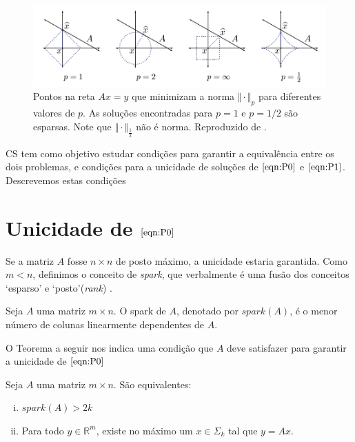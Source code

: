 \begin{figure}
\centering
\includegraphics[scale=.6]{imagens/normas.png}
\caption{Pontos na reta $Ax = y$ que minimizam a norma $\Vert \cdot \Vert_p$ para diferentes valores de $p$. As soluções encontradas para $p = 1$ e $p = 1/2$ são esparsas. Note que $\Vert \cdot \Vert_{\frac{1}{2}}$ não é norma. Reproduzido de \cite{ddek}.}
\label{fig:normas}
\end{figure}

CS tem como objetivo estudar condições para garantir a equivalência entre os dois problemas, e condições para a unicidade de soluções de $\eqref{eqn:P0}$ e $\eqref{eqn:P1}$. Descrevemos estas condições  

\section{Unicidade de $\eqref{eqn:P0}$}
Se a matriz $A$ fosse $n \times n$ de posto máximo, a unicidade estaria garantida. Como $m < n$, definimos o conceito de \textit{spark}, que verbalmente é uma fusão dos conceitos `esparso' e `posto'(\textit{rank}) \cite{kutyniok}.

\begin{definicao}
Seja $A$ uma matriz $m \times n$. O spark de $A$, denotado por $\textit{spark}(A)$, é o menor número de colunas linearmente dependentes de $A$.
\end{definicao}

O Teorema a seguir nos indica uma condição que $A$ deve satisfazer para garantir a unicidade de $\eqref{eqn:P0}$

\begin{teorema}
\label{thm:unicidade_P0}
Seja $A$ uma matriz $m \times n$. São equivalentes:

\begin{enumerate}[(i)]
\item $\textit{spark}(A)> 2k$

\item Para todo $y \in \mathbb{R}^m$, existe no máximo um $x \in \Sigma_k$ tal que $y = Ax$.
\end{enumerate}
\end{teorema}

